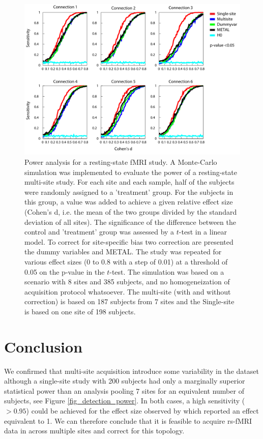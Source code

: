 \begin{figure}[H]
\begin{center}
\includegraphics[width=\linewidth]{../figures/multisite_simulation_50pct.pdf}
\end{center}
\caption[Detection power 2]{
Power analysis for a resting-state fMRI study. A Monte-Carlo simulation was implemented to evaluate the power of a resting-state multi-site study. For each site and each sample, half of the subjects were randomly assigned to a 'treatment' group. For the subjects in this group, a value was added to achieve a given relative effect size (Cohen's d, i.e. the mean of the two groups divided by the standard deviation of all sites). The significance of the difference between the control and 'treatment' group was assessed by a $t$-test in a linear model. To correct for site-specific bias two correction are presented the dummy variables and METAL. The study was repeated for various effect sizes (0 to 0.8 with a step of 0.01) at a threshold of 0.05 on the p-value in the $t$-test. The simulation was based on a scenario with 8 sites and 385 subjects, and no homogeneization of acquisition protocol whatsoever. The multi-site (with and without correction) is based on 187 subjects from 7 sites and the Single-site is based on 
one site of 198 subjects. 
}
\label{fig_simu_50pct}
\end{figure}


\section{Conclusion}

We confirmed that multi-site acquisition introduce some variability in the dataset although a single-site study with 200 subjects had only a marginally superior statistical power than an analysis pooling 7 sites for an equivalent number of subjects, see Figure \ref{fig_detection_power}. In both cases, a high sensitivity ($>0.95$) could be achieved for the effect size observed by \cite{Goveas2011} which reported an effect equivalent to 1. We can therefore conclude that it is feasible to acquire rs-fMRI data in across multiple sites and correct for this topology.

